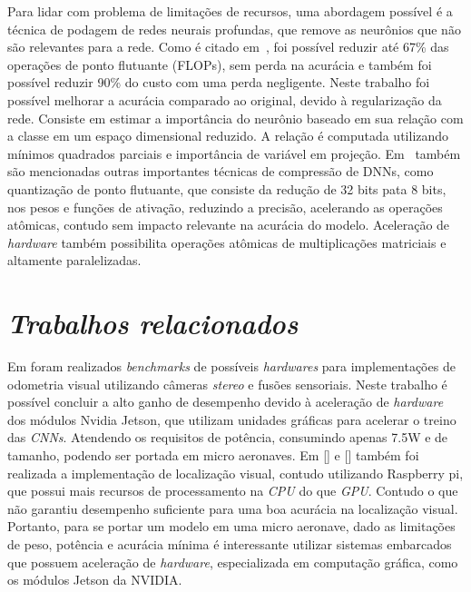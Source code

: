 Para lidar com problema de limitações de recursos, uma abordagem possível é a técnica de podagem de redes neurais profundas, que remove as neurônios que não são relevantes para a rede. Como é citado em~\cite{jordao2019pruning}, foi possível reduzir até 67\% das operações de ponto flutuante (FLOPs), sem perda na acurácia e também foi possível reduzir 90\% do custo com uma perda negligente. Neste trabalho foi possível melhorar a acurácia comparado ao original, devido à regularização da rede. Consiste em estimar a importância do neurônio baseado em sua relação com a classe em um espaço dimensional reduzido. A relação é computada utilizando mínimos quadrados parciais e importância de variável em projeção. Em~\cite{jordao2019pruning} também são mencionadas outras importantes técnicas de compressão de DNNs, como quantização de ponto flutuante, que consiste da redução de 32 bits pata 8 bits, nos pesos e funções de ativação, reduzindo a precisão, acelerando as operações atômicas, contudo sem impacto relevante na acurácia do modelo. Aceleração de \textit{hardware} também possibilita operações atômicas de multiplicações matriciais e altamente paralelizadas. 

\section{\textit{Trabalhos relacionados}}\label{sec:Cap2_MR}


Em \cite{jeon2021run} foram realizados \textit{benchmarks} de possíveis \textit{hardwares} para implementações de odometria visual utilizando câmeras \textit{stereo} e fusões sensoriais. Neste trabalho é possível concluir a alto ganho de desempenho devido à aceleração de \textit{hardware} dos módulos Nvidia Jetson, que utilizam unidades gráficas para acelerar o treino das \textit{CNNs}. Atendendo os requisitos de potência, consumindo apenas 7.5W e de tamanho, podendo ser portada em micro aeronaves.  Em [] e [] também foi realizada a implementação de localização visual, contudo utilizando Raspberry pi, que  possui mais recursos de processamento na \textit{CPU} do que \textit{GPU}. Contudo  o que não garantiu desempenho suficiente para uma boa acurácia na localização visual. Portanto, para se portar um modelo em uma micro aeronave, dado as limitações de peso, potência e acurácia mínima é interessante utilizar sistemas embarcados que possuem aceleração de \textit{hardware}, especializada em computação gráfica, como os módulos Jetson da NVIDIA.
